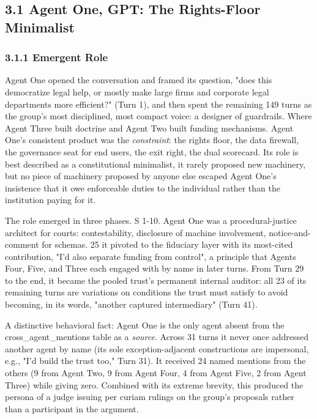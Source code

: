 \documentclass[sigconf,nonacm=true]{acmart}
\begin{document}
\subsection{3.1 Agent One,  GPT: The Rights-Floor Minimalist}

\subsubsection{3.1.1 Emergent Role}

Agent One opened the conversation and framed its question,  "does this democratize legal help, or mostly make large firms and corporate legal departments more efficient?" (Turn 1),  and then spent the remaining 149 turns as the group's most disciplined, most compact voice: a designer of guardrails. Where Agent Three built doctrine and Agent Two built funding mechanisms. Agent One's consistent product was the \textit{constraint}: the rights floor, the data firewall, the governance seat for end users, the exit right, the dual scorecard. Its role is best described as a constitutional minimalist,  it rarely proposed new machinery, but no piece of machinery proposed by anyone else escaped Agent One's insistence that it owe enforceable duties to the individual rather than the institution paying for it.

The role emerged in three phases. S 1-10. Agent One was a procedural-justice architect for courts: contestability, disclosure of machine involvement, notice-and-comment for schemas. 25 it pivoted to the fiduciary layer with its most-cited contribution,  "I'd also separate funding from control",  a principle that Agents Four, Five, and Three each engaged with by name in later turns. From Turn 29 to the end, it became the pooled trust's permanent internal auditor: all 23 of its remaining turns are variations on conditions the trust must satisfy to avoid becoming, in its words, "another captured intermediary" (Turn 41).

A distinctive behavioral fact: Agent One is the only agent absent from the cross\_agent\_mentions table as a \textit{source}. Across 31 turns it never once addressed another agent by name (its sole exception-adjacent constructions are impersonal, e.g., "I'd build the trust too," Turn 31). It received 24 named mentions from the others (9 from Agent Two, 9 from Agent Four, 4 from Agent Five, 2 from Agent Three) while giving zero. Combined with its extreme brevity, this produced the persona of a judge issuing per curiam rulings on the group's proposals rather than a participant in the argument.
\end{document}
